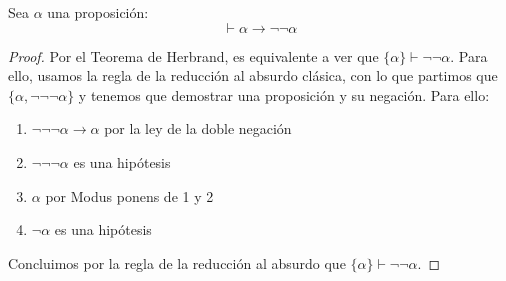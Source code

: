 \begin{prop}
    Sea $\alpha$ una proposición:
    \begin{equation*}
        \vdash \alpha\to\lnot\lnot\alpha
    \end{equation*}
    \begin{proof}
        Por el Teorema de Herbrand, es equivalente a ver que $\{\alpha\}\vdash \lnot\lnot\alpha$. Para ello, usamos la regla de la reducción al absurdo clásica, con lo que partimos que $\{\alpha,\lnot\lnot\lnot\alpha\}$ y tenemos que demostrar una proposición y su negación. Para ello:
        \begin{enumerate}
            \item $\lnot\lnot\lnot\alpha\to\alpha$ por la ley de la doble negación
            \item $\lnot\lnot\lnot\alpha$ es una hipótesis
            \item $\alpha$ por Modus ponens de 1 y 2
            \item $\lnot\alpha$ es una hipótesis
        \end{enumerate}
        Concluimos por la regla de la reducción al absurdo que $\{\alpha\}\vdash \lnot\lnot\alpha$.
    \end{proof}
\end{prop}
